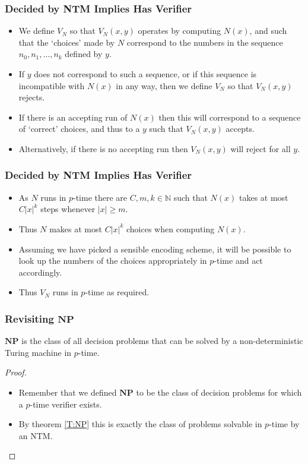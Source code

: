 \documentclass[handout]{beamer}
\newcommand{\bN}{\mathbb{N}}
\newcommand{\NP}{\mathbf{NP}}
\begin{document}
\begin{frame}
\frametitle{Decided by NTM Implies Has Verifier}
\begin{itemize}
\item We define $V_N$ so that $V_N(x,y)$ operates by computing $N(x)$, and such that the `choices' made by $N$ correspond to the numbers in the sequence $n_0,n_1,\ldots,n_k$ defined by $y$. 
\vspace{0.5cm}
\item If $y$ does not correspond to such a sequence, or if this sequence is incompatible with $N(x)$ in any way, then we define $V_N$ so that $V_N(x,y)$ rejects. 
\vspace{0.5cm}
\item If there is an accepting run of $N(x)$ then this will correspond to a sequence of `correct' choices, and thus to a $y$ such that $V_N(x,y)$ accepts. 
\vspace{0.5cm}
\item Alternatively, if there is no accepting run then $V_N(x,y)$ will reject for all $y$.
\end{itemize}
\end{frame}

\begin{frame}
\frametitle{Decided by NTM Implies Has Verifier}
\begin{itemize}
\item As $N$ runs in $p$-time there are $C,m,k\in \bN$ such that $N(x)$ takes at most $C|x|^k$ steps whenever $|x|\geq m$. 
\vspace{0.5cm}
\item Thus $N$ makes at most $C|x|^k$ choices when computing $N(x)$. 
\vspace{0.5cm}
\item Assuming we have picked a sensible encoding scheme, it will be possible to look up the numbers of the choices appropriately in $p$-time and act accordingly. 
\vspace{0.5cm}
\item Thus $V_N$ runs in $p$-time as required.
\end{itemize}
\end{frame}

\begin{frame}
\frametitle{Revisiting $\NP$}
\begin{corollary}
$\NP$ is the class of all decision problems that can be solved by a non-deterministic Turing machine in $p$-time.
\end{corollary}
\begin{proof}
\begin{itemize}

\item Remember that we defined $\NP$ to be the class of decision problems for which a $p$-time verifier exists. 
\item By theorem \ref{T:NP} this is exactly the class of problems solvable in $p$-time by an NTM.
\end{itemize}
\end{proof} 
\end{frame}
\end{document}
